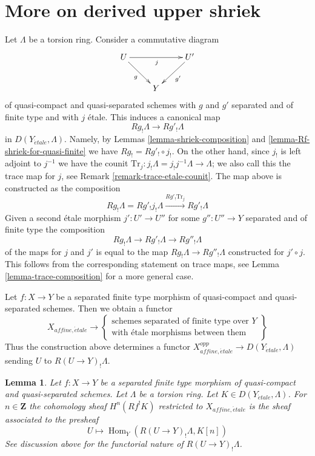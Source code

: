 \documentclass{stacks-project}
\theoremstyle{plain}
\newtheorem{lemma}[subsection]{Lemma}
\theoremstyle{definition}
\theoremstyle{remark}
\numberwithin{equation}{subsection}
\def\Hom{\mathop{\mathrm{Hom}}\nolimits}
\def\etale{{\acute{e}tale}}
\begin{document}
\section{More on derived upper shriek}
\label{section-more-derived-upper-shriek}

\noindent
Let $\Lambda$ be a torsion ring. Consider a commutative diagram
$$
\xymatrix{
U \ar[rr]_j \ar[rd]_g & & U' \ar[ld]^{g'} \\
& Y
}
$$
of quasi-compact and quasi-separated schemes with $g$ and $g'$
separated and of finite type and with $j$ \'etale. This induces
a canonical map
$$
Rg_!\Lambda \longrightarrow Rg'_!\Lambda
$$
in $D(Y_\etale, \Lambda)$. Namely, by Lemmas \ref{lemma-shriek-composition}
and \ref{lemma-Rf-shriek-for-quasi-finite} we have $Rg_! = Rg'_! \circ j_!$.
On the other hand, since $j_!$ is left adjoint to $j^{-1}$ we have
the counit $\text{Tr}_j : j_!\Lambda = j_!j^{-1}\Lambda \to \Lambda$;
we also call this the trace map for $j$, see
Remark \ref{remark-trace-etale-counit}.
The map above is constructed as the composition
$$
Rg_!\Lambda = Rg'_!j_!\Lambda
\xrightarrow{Rg'_! \text{Tr}_j}
Rg'_!\Lambda
$$
Given a second \'etale morphism $j' : U' \to U''$
for some $g'' : U'' \to Y$ separated and of finite type
the composition
$$
Rg_!\Lambda \longrightarrow Rg'_!\Lambda \longrightarrow Rg''_!\Lambda
$$
of the maps for $j$ and $j'$ is equal to the map
$Rg_!\Lambda \longrightarrow Rg''_!\Lambda$ constructed for $j' \circ j$.
This follows from the corresponding statement on trace maps,
see Lemma \ref{lemma-trace-composition} for a more general case.

\medskip\noindent
Let $f : X \to Y$ be a separated finite type morphism of quasi-compact
and quasi-separated schemes. Then we obtain a functor
$$
X_{affine, \etale}
\longrightarrow
\left\{
\begin{matrix}
\text{schemes separated of finite type over }Y\\
\text{with \'etale morphisms between them}
\end{matrix}
\right\}
$$
Thus the construction above determines a functor
$X_{affine, \etale}^{opp} \to D(Y_\etale, \Lambda)$
sending $U$ to $R(U \to Y)_!\Lambda$.

\begin{lemma}
\label{lemma-describe-Rf-upper-shriek}
Let $f : X \to Y$ be a separated finite type morphism of quasi-compact
and quasi-separated schemes. Let $\Lambda$ be a torsion ring.
Let $K \in D(Y_\etale, \Lambda)$. For $n \in \mathbf{Z}$ the
cohomology sheaf $H^n(Rf^!K)$ restricted to $X_{affine, \etale}$
is the sheaf associated to the presheaf
$$
U \longmapsto \Hom_Y(R(U \to Y)_!\Lambda, K[n])
$$
See discussion above for the functorial nature of $R(U \to Y)_!\Lambda$.
\end{lemma}
\end{document}
